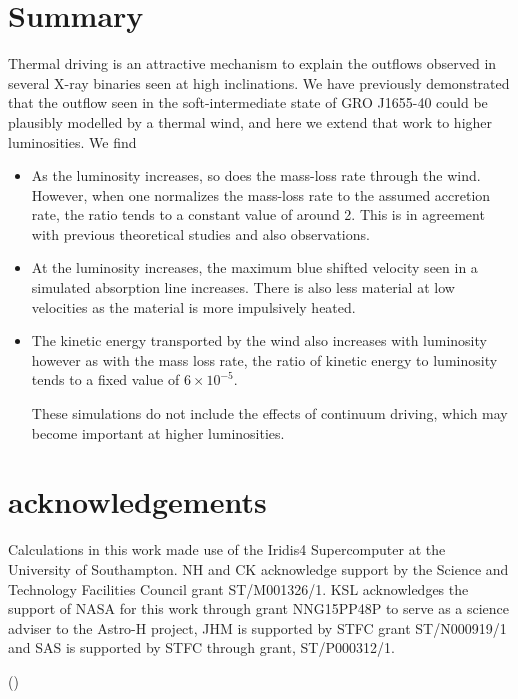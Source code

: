 \documentclass[a4paper,fleqn,usenatbib]{mnras}
\begin{document}
\section{Summary }

Thermal driving is an attractive mechanism to explain the outflows observed in several 
X-ray binaries seen at high inclinations. We have previously demonstrated that 
the outflow seen in the soft-intermediate state of GRO J1655-40 could be plausibly 
modelled by a thermal wind, and here we extend that work to higher luminosities. We find

\begin{itemize}
\item{As the luminosity increases, so does the mass-loss rate through the wind. However, 
when one normalizes the mass-loss rate to the assumed accretion rate, the ratio tends to 
a constant value of around 2. This is in agreement with previous theoretical studies and 
also observations.}
\item{At the luminosity increases, the maximum blue shifted velocity seen in a simulated 
absorption line increases. There is also less material at low velocities as the material 
is more impulsively heated.}
\item{The kinetic energy transported by the wind also increases with luminosity however 
as with the mass loss rate, the ratio of kinetic energy to luminosity tends to a fixed value
of $6\times10^{-5}$.}

These simulations do not include the effects of continuum driving, which may become
important at higher luminosities. 



\end{itemize}

\section{acknowledgements}
Calculations in this work made use of the Iridis4 Supercomputer at the University of Southampton.
NH and CK  acknowledge support by the Science and Technology Facilities Council grant ST/M001326/1. 
KSL acknowledges the support of NASA for this work through grant NNG15PP48P to serve as a 
science adviser to the Astro-H project, JHM is supported by STFC grant ST/N000919/1 and SAS 
is supported by STFC through grant, ST/P000312/1. 




()
\label{lastpage}

\bsp	%
\end{document}
